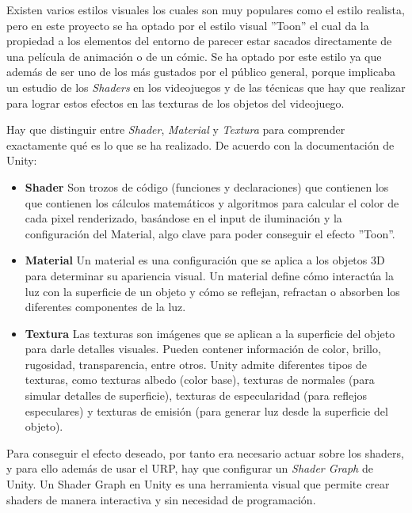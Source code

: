 Existen varios estilos visuales los cuales son muy populares como el estilo realista, pero en este proyecto se ha optado por el estilo visual ''Toon'' el cual da la propiedad a los elementos del entorno de parecer estar sacados directamente de una película de animación o de un cómic. Se ha optado por este estilo ya que además de ser uno de los más gustados por el público general, porque implicaba un estudio de los \textit{Shaders} en los videojuegos y de las técnicas que hay que realizar para lograr estos efectos en las texturas de los objetos del videojuego.

Hay que distinguir entre \textit{Shader}, \textit{Material} y \textit{Textura} para comprender exactamente qué es lo que se ha realizado. De acuerdo con la documentación de Unity:

\begin{itemize}    
    \item \textbf{Shader} Son trozos de código (funciones y declaraciones) que contienen los que contienen los cálculos matemáticos y algoritmos para calcular el color de cada pixel renderizado, basándose en el input de iluminación y la configuración del Material, algo clave para poder conseguir el efecto ''Toon''.
   
    \item \textbf{Material} Un material es una configuración que se aplica a los objetos 3D para determinar su apariencia visual. Un material define cómo interactúa la luz con la superficie de un objeto y cómo se reflejan, refractan o absorben los diferentes componentes de la luz.

    \item \textbf{Textura}  Las texturas son imágenes que se aplican a la superficie del objeto para darle detalles visuales. Pueden contener información de color, brillo, rugosidad, transparencia, entre otros. Unity admite diferentes tipos de texturas, como texturas albedo (color base), texturas de normales (para simular detalles de superficie), texturas de especularidad (para reflejos especulares) y texturas de emisión (para generar luz desde la superficie del objeto).
\end{itemize}

Para conseguir el efecto deseado, por tanto era necesario actuar sobre los shaders, y para ello además de usar el URP, hay que configurar un \textit{Shader Graph} \cite{ShaderGraph} de Unity. Un Shader Graph en Unity es una herramienta visual que permite crear shaders de manera interactiva y sin necesidad de programación.

